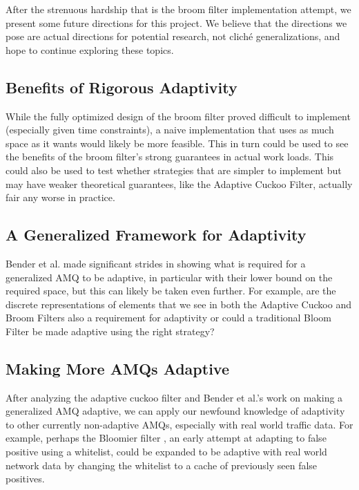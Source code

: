 \documentclass[../paper.tex]{subfiles}
\begin{document}
After the strenuous hardship that is the broom filter implementation attempt,
we present some future directions for this project. We believe that the directions
we pose are actual directions for potential research, not clich\'e generalizations,
and hope to continue exploring these topics.

\subsection{Benefits of Rigorous Adaptivity}
While the fully optimized design of the broom filter proved difficult to implement (especially given time constraints),
a naive implementation that uses as much space as it wants would likely be 
more feasible.  This in turn could be used to see the benefits of the broom filter's
strong guarantees in actual work loads.  This could also be used to test whether 
strategies that are simpler to implement but may have weaker theoretical 
guarantees, like the Adaptive Cuckoo Filter, actually fair any worse in practice.  

\subsection{A Generalized Framework for Adaptivity}
Bender et al. \cite{broom-filter} made significant strides in showing what is required
for a generalized AMQ to be adaptive, in particular with their lower bound on the required 
space, but this can likely be taken even further.  For example, are the discrete 
representations of elements that we see in both the Adaptive Cuckoo and Broom 
Filters also a requirement for adaptivity or could a traditional Bloom Filter be made 
adaptive using the right strategy?

\subsection{Making More AMQs Adaptive}
After analyzing the adaptive cuckoo filter \cite{adaptive-cuckoo} and Bender et al.'s work on
making a generalized AMQ adaptive, we can apply our newfound knowledge of adaptivity to other
currently non-adaptive AMQs, especially with real world traffic data. For example, perhaps
the Bloomier filter \cite{bloomier-filter}, an early attempt at adapting to false positive
using a whitelist, could be expanded to be adaptive with real world network data by changing the whitelist to a
cache of previously seen false positives.
\end{document}
